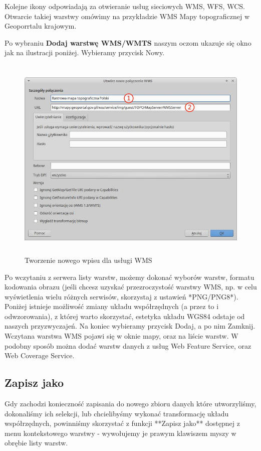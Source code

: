 \documentclass[12pt,a4paper]{book}
\begin{document}
Kolejne ikony odpowiadają za otwieranie usług sieciowych WMS, WFS, WCS. Otwarcie takiej warstwy omówimy na przykładzie WMS Mapy topograficznej w Geoporrtalu krajowym.

Po wybraniu \textbf{Dodaj warstwę WMS/WMTS} naszym oczom ukazuje się okno jak na ilustracji poniżej. Wybieramy przycisk Nowy.

\begin{center}
\begin{figure}
\includegraphics[width=13cm,height=9.931cm]{002-tworzenie-wms.jpg}
\caption{Tworzenie nowego wpisu dla usługi WMS}
\end{figure}
\end{center}
Po wczytaniu z serwera listy warstw, możemy dokonać wyborów warstw, formatu kodowania obrazu (jeśli chcesz uzyskać przezroczystość warstwy WMS, np. w celu wyświetlenia wielu różnych serwisów, skorzystaj z ustawień *PNG/PNG8*). Poniżej istnieje możliwość zmiany układu współrzędnych (a przez to i odwzorowania), z której warto skorzystać, estetyka układu WGS84 odstaje od naszych przyzwyczajeń. Na koniec wybieramy przycisk Dodaj, a po nim Zamknij. Wczytana warstwa WMS pojawi się w oknie mapy, oraz na liście warstw.
W podobny sposób można dodać warstw danych z usług Web Feature Service, oraz Web Coverage Service.

\subsection{Zapisz jako}
Gdy zachodzi konieczność zapisania do nowego zbioru danych które utworzyliśmy, dokonaliśmy ich selekcji, lub chcielibyśmy wykonać transformację układu współrzędnych, powinniśmy skorzystać z funkcji **Zapisz jako** dostępnej z menu kontekstowego warstwy - wywołujemy je prawym klawiszem myszy w obrębie listy warstw.
\end{document}
